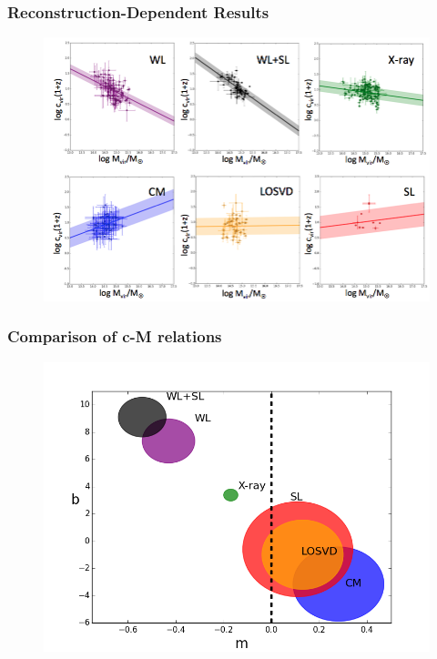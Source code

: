 \documentclass[hyperref={pdfpagelabels=false}]{beamer}
\begin{document}
\begin{frame}
\frametitle{Reconstruction-Dependent Results}
  \begin{figure}
    \includegraphics[width=\textwidth]{FitToEachMethod_Mod.png}
  \end{figure}  
\end{frame}

\begin{frame}
  \frametitle{Comparison of c-M relations}
  \begin{figure}
    \includegraphics[width=\textwidth]{fit_comparison2.png}
  \end{figure}  
\end{frame}
\end{document}
